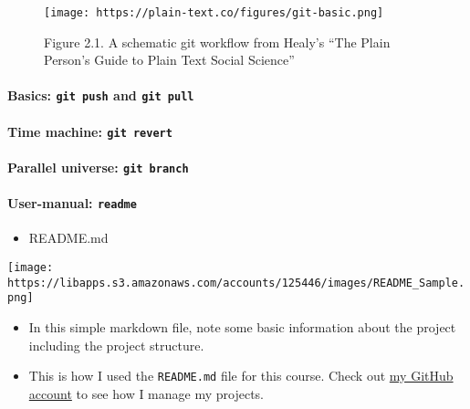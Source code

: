 \documentclass[
]{book}
\providecommand{\tightlist}{%
  \setlength{\itemsep}{0pt}\setlength{\parskip}{0pt}}
\begin{document}
\begin{figure}
\centering
\texttt{[image: https://plain-text.co/figures/git-basic.png]}
\caption{Figure 2.1. A schematic git workflow from Healy's ``The Plain Person's Guide to Plain Text Social Science''}
\end{figure}

\hypertarget{basics-git-push-and-git-pull}{%
\paragraph{\texorpdfstring{Basics: \texttt{git\ push} and \texttt{git\ pull}}{Basics: git push and git pull}}\label{basics-git-push-and-git-pull}}

\hypertarget{time-machine-git-revert}{%
\paragraph{\texorpdfstring{Time machine: \texttt{git\ revert}}{Time machine: git revert}}\label{time-machine-git-revert}}

\hypertarget{parallel-universe-git-branch}{%
\paragraph{\texorpdfstring{Parallel universe: \texttt{git\ branch}}{Parallel universe: git branch}}\label{parallel-universe-git-branch}}

\hypertarget{user-manual-readme}{%
\paragraph{\texorpdfstring{User-manual: \texttt{readme}}{User-manual: readme}}\label{user-manual-readme}}

\begin{itemize}
\tightlist
\item
  README.md
\end{itemize}

\texttt{[image: https://libapps.s3.amazonaws.com/accounts/125446/images/README\_Sample.png]}

\begin{itemize}
\item
  In this simple markdown file, note some basic information about the project including the project structure.
\item
  This is how I used the \texttt{README.md} file for this course. Check out \href{https://github.com/jaeyk}{my GitHub account} to see how I manage my projects.
\end{itemize}
\end{document}
